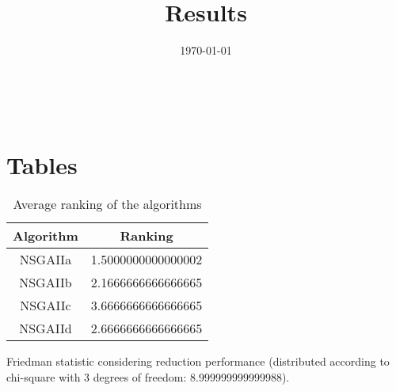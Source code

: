 \documentclass{article}
\title{Results}
\author{}
\date{\today}
\begin{document}
\oddsidemargin 0in \topmargin 0in\maketitle
\
\section{Tables}
\begin{table}[!htp]
\centering
\caption{Average ranking of the algorithms}
\begin{tabular}{c|c}
Algorithm&Ranking\\
\hline
NSGAIIa&1.5000000000000002\\
NSGAIIb&2.1666666666666665\\
NSGAIIc&3.6666666666666665\\
NSGAIId&2.6666666666666665\\
\end{tabular}
\end{table}


Friedman statistic considering reduction performance (distributed according to chi-square with 3 degrees of freedom: 8.999999999999988).
\end{document}
